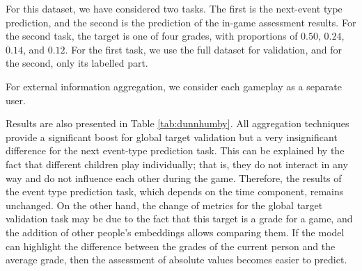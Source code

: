 For this dataset, we have considered two tasks. The first is the next-event type prediction, and the second is the prediction of the in-game assessment results. For the second task, the target is one of four grades, with proportions of $0.50$, $0.24$, $0.14$, and $0.12$. For the first task, we use the full dataset for validation, and for the second, only its labelled part.

For external information aggregation, we consider each gameplay as a separate user.


Results are also presented in Table \ref{tab:dunnhumby}. All aggregation techniques provide a significant boost for global target validation but a very insignificant difference for the next event-type prediction task. This can be explained by the fact that different children play individually; that is, they do not interact in any way and do not influence each other during the game. Therefore, the results of the event type prediction task, which depends on the time component, remains unchanged. 
On the other hand, the change of metrics for the global target validation task may be due to the fact that this target is a grade for a game, and the addition of other people’s embeddings allows comparing them. If the model can highlight the difference between the grades of the current person and the average grade, then the assessment of absolute values becomes easier to predict.

